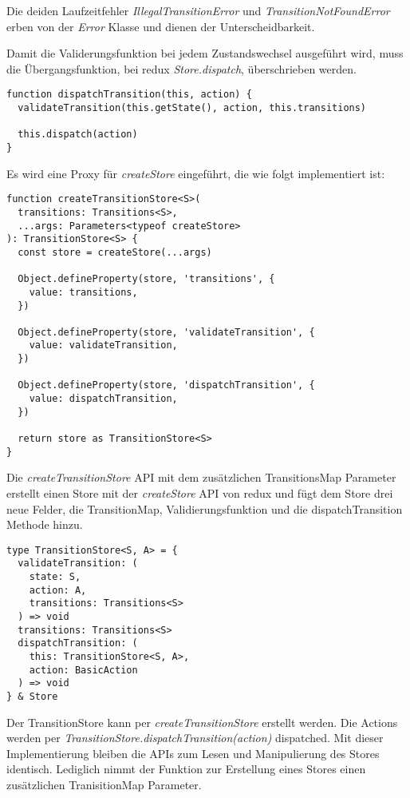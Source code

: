 Die deiden Laufzeitfehler \textit{IllegalTransitionError} und \textit{TransitionNotFoundError} erben von der \textit{Error} Klasse und dienen der Unterscheidbarkeit.

Damit die Validerungsfunktion bei jedem Zustandswechsel ausgeführt wird, muss die Übergangsfunktion, bei redux \textit{Store.dispatch}, überschrieben werden.

\begin{lstlisting}
function dispatchTransition(this, action) {
  validateTransition(this.getState(), action, this.transitions)
  
  this.dispatch(action)
}
\end{lstlisting}

Es wird eine Proxy für \textit{createStore} eingeführt, die wie folgt implementiert ist:

\begin{lstlisting}
function createTransitionStore<S>(
  transitions: Transitions<S>,
  ...args: Parameters<typeof createStore>
): TransitionStore<S> {
  const store = createStore(...args)
  
  Object.defineProperty(store, 'transitions', {
    value: transitions,
  })
  
  Object.defineProperty(store, 'validateTransition', {
    value: validateTransition,
  })
  
  Object.defineProperty(store, 'dispatchTransition', {
    value: dispatchTransition,
  })
  
  return store as TransitionStore<S>
}
\end{lstlisting}

Die \textit{createTransitionStore} API mit dem zusätzlichen TransitionsMap Parameter erstellt einen Store mit der \textit{createStore} API von redux und fügt dem Store drei neue Felder, die TransitionMap, Validierungsfunktion und die dispatchTransition Methode hinzu.

\begin{lstlisting}
type TransitionStore<S, A> = {
  validateTransition: (
    state: S,
    action: A,
    transitions: Transitions<S>
  ) => void
  transitions: Transitions<S>
  dispatchTransition: (
    this: TransitionStore<S, A>,
    action: BasicAction
  ) => void
} & Store  
\end{lstlisting}

Der TransitionStore kann per \textit{createTransitionStore} erstellt werden. Die Actions werden per \textit{TransitionStore.dispatchTransition(action)} dispatched. Mit dieser Implementierung bleiben die APIs zum Lesen und Manipulierung des Stores identisch. Lediglich nimmt der Funktion zur Erstellung eines Stores einen zusätzlichen TranisitionMap Parameter.


